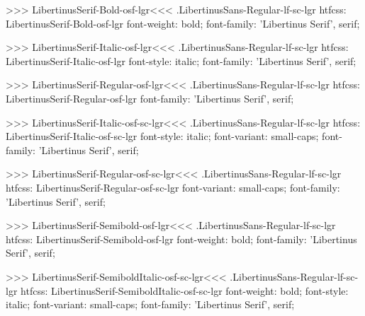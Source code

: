 >>>
\<LibertinusSerif-Bold-osf-lgr\><<<
.LibertinusSans-Regular-lf-sc-lgr
htfcss:  LibertinusSerif-Bold-osf-lgr  font-weight: bold; font-family: 'Libertinus Serif', serif;

>>>
\<LibertinusSerif-Italic-osf-lgr\><<<
.LibertinusSans-Regular-lf-sc-lgr
htfcss:  LibertinusSerif-Italic-osf-lgr  font-style: italic; font-family: 'Libertinus Serif', serif;

>>>
\<LibertinusSerif-Regular-osf-lgr\><<<
.LibertinusSans-Regular-lf-sc-lgr
htfcss:  LibertinusSerif-Regular-osf-lgr  font-family: 'Libertinus Serif', serif;

>>>
\<LibertinusSerif-Italic-osf-sc-lgr\><<<
.LibertinusSans-Regular-lf-sc-lgr
htfcss:  LibertinusSerif-Italic-osf-sc-lgr  font-style: italic; font-variant: small-caps; font-family: 'Libertinus Serif', serif;

>>>
\<LibertinusSerif-Regular-osf-sc-lgr\><<<
.LibertinusSans-Regular-lf-sc-lgr
htfcss:  LibertinusSerif-Regular-osf-sc-lgr  font-variant: small-caps; font-family: 'Libertinus Serif', serif;

>>>
\<LibertinusSerif-Semibold-osf-lgr\><<<
.LibertinusSans-Regular-lf-sc-lgr
htfcss:  LibertinusSerif-Semibold-osf-lgr  font-weight: bold; font-family: 'Libertinus Serif', serif;

>>>
\<LibertinusSerif-SemiboldItalic-osf-sc-lgr\><<<
.LibertinusSans-Regular-lf-sc-lgr
htfcss:  LibertinusSerif-SemiboldItalic-osf-sc-lgr  font-weight: bold; font-style: italic; font-variant: small-caps; font-family: 'Libertinus Serif', serif;


